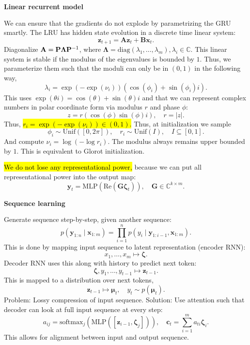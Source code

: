 \documentclass[10pt]{article}
\newenvironment{topic}[1]
{\textbf{\sffamily \footnotesize \colorbox{black}{\rlap{\textbf{\textcolor{white}{#1}}}\hspace{\linewidth}\hspace{-2\fboxsep}}}}
{}
\newenvironment{subtopic}[1]
{\begin{center}\textbf{\footnotesize \sffamily #1}\end{center}}
{}
\renewcommand{\mat}[1]{\ensuremath{\mathbf{#1}}}
\renewcommand{\vec}[1]{\ensuremath{\mathbold{#1}}}
\newcommand{\Break}{\vfill\null\columnbreak}
\begin{document}
\begin{multicols*}{3}
\begin{topic}{Recurrent neural networks}
\begin{subtopic}{Linear recurrent model}
            We can ensure that the gradients do not explode by parametrizing the GRU smartly. The LRU has
            hidden state evolution in a discrete time linear system: \[
                \vec{z}_{t+1} = \mat{A} \vec{z}_t + \mat{B} \vec{x}_t.
            \]
            Diagonalize $\mat{A} = \mat{P}\mat{\Lambda}\inv{\mat{P}}$, where $\mat{\Lambda} =
                \mathrm{diag}(\lambda_1, \ldots, \lambda_m), \lambda_i \in \mathbb{C}$. This linear system is
            stable if the modulus of the eigenvalues is bounded by $1$. Thus, we parameterize them such that
            the moduli can only be in $(0,1)$ in the following way, \[
                \lambda_i = \exp(-\exp(\nu_i))(\cos(\phi_i) + \sin(\phi_i)i).
            \]
            This uses $\exp(\theta i) = \cos(\theta) + \sin(\theta)i$ and that we can represent complex numbers
            in polar coordinate form via modulus $r$ and phase $\phi$: \[
                z = r(\cos(\phi) \sin(\phi) i), \quad r = |z|.
            \]
            Thus, \hl{$r_i = \exp(-\exp(\nu_i)) \in (0,1)$.} Thus, at initialization we sample \[
                \phi_i \sim \mathrm{Unif}([0,2\pi]), \quad r_i \sim \mathrm{Unif}(I), \quad I \subseteq [0,1].
            \]
            And compute $\nu_i = \log(-\log r_i)$. The modulus always remains upper bounded by $1$. This is
            equivalent to Glorot initialization.

            \hl{We do not lose any representational power,} because we can put all representational power into the
            output map: \[
                \vec{y}_t = \mathrm{MLP}(\mathrm{Re}(\mat{G}\vec{\zeta}_t)), \quad \mat{G} \in \mathbb{C}^{k \times m}.
            \]
        \end{subtopic}

        \Break

        \begin{subtopic}{Sequence learning}
            Generate sequence step-by-step, given another sequence: \[
                p(\vec{y}_{1:n} \mid \vec{x}_{1:m}) = \prod_{i=1}^n p(y_i \mid \vec{y}_{1:i-1}, \vec{x}_{1:m}).
            \]
            This is done by mapping input sequence to latent representation (encoder RNN): \[
                x_1, \ldots, x_m \mapsto \vec{\zeta}.
            \]
            Decoder RNN uses this along with history to predict next token: \[
                \vec{\zeta}, y_1, \ldots, y_{t-1} \mapsto \vec{z}_{t-1}.
            \]
            This is mapped to a distribution over next tokens, \[
                \vec{z}_{t-1} \mapsto \vec{\mu}_t, \quad y_t \sim p(\vec{\mu}_t).
            \]
            Problem: Lossy compression of input sequence. Solution: Use attention such that decoder can look at
            full input sequence at every step: \[
                a_{ij} = \mathrm{softmax}_j(\mathrm{MLP}([\vec{z}_{i-1}, \vec{\zeta}_j])), \quad \vec{c}_t = \sum_{i=1}^{m} a_{ti} \vec{\zeta}_i.
            \]
            This allows for alignment between input and output sequence.
        \end{subtopic}


\end{topic}
\end{multicols*}
\end{document}
